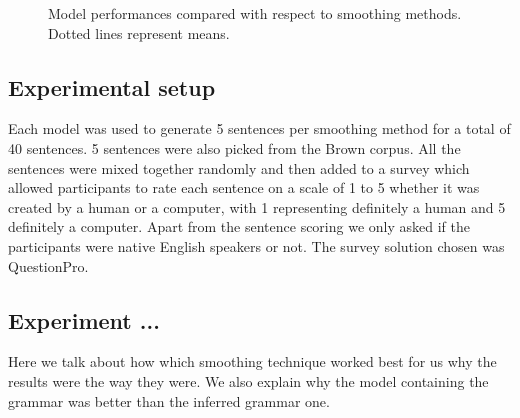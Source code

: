\documentclass[a4paper,12pt]{article}
\begin{document}
\begin{figure}[t!]
    \qquad
    \caption{Model performances compared with respect to smoothing methods. Dotted lines represent means.}%
    \label{fig:example}%
\end{figure}

\subsection{Experimental setup}
Each model was used to generate 5 sentences per smoothing method for a total of 40 sentences. 5 sentences were also picked from the Brown corpus. All the sentences were mixed together randomly and then added to a survey which allowed participants to rate each sentence on a scale of 1 to 5 whether it was created by a human or a computer, with 1 representing definitely a human and 5 definitely a computer. Apart from the sentence scoring we only asked if the participants were native English speakers or not. The survey solution chosen was QuestionPro.

\subsection{Experiment ...}

Here we talk about how which smoothing technique worked best for us why the results were the way they were. We also explain why the model containing the grammar was better than the inferred grammar one.
\end{document}
